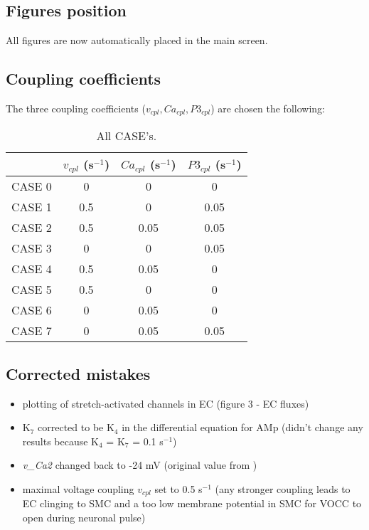 \documentclass[12pt]{article}
\begin{document}
\subsection{Figures position} 
All figures are now automatically placed in the main screen. 

\subsection{Coupling coefficients}
The three coupling coefficients ($v_{cpl}, Ca_{cpl}, P3_{cpl}$) are chosen the following:

\begin{table}[h!]
\centering
\caption{All CASE's.}
\begin{tabular}{c c c c}
\hline
       & $v_{cpl}$ (s$^{-1}$) & $Ca_{cpl}$ (s$^{-1}$)& $P3_{cpl}$ (s$^{-1}$)\\
       \hline \hline
CASE 0 & 0     & 0     & 0     \\
CASE 1 & 0.5   & 0     & 0.05  \\
CASE 2 & 0.5   & 0.05  & 0.05  \\
CASE 3 & 0     & 0     & 0.05  \\
CASE 4 & 0.5   & 0.05  & 0     \\
CASE 5 & 0.5   & 0     & 0     \\
CASE 6 & 0     & 0.05  & 0     \\
CASE 7 & 0     & 0.05  & 0.05  \\
\hline
\end{tabular}
\end{table}

\subsection{Corrected mistakes}
\begin{itemize}
\item plotting of stretch-activated channels in EC (figure 3 - EC fluxes)
\item K$_{7}$ corrected to be K$_{4}$ in the differential equation for AMp (didn't change any results because K$_{4}$ = K$_{7}$ = 0.1 s$ ^{-1} $)
\item \textit{v\_Ca2} changed back to -24 mV (original value from \cite{Koenigsberger2005})
\item maximal voltage coupling $v_{cpl}$ set to 0.5 s$^{-1}$ (any stronger coupling leads to EC clinging to SMC and a too low membrane potential in SMC for VOCC to open during neuronal pulse)
\end{itemize}


 
 
\end{document}
